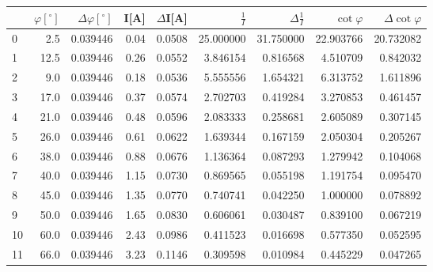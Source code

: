 \begin{tabular}{lrrrrrrrr}
\toprule
{} &  $\varphi[^\circ]$ &  $\Delta \varphi[^\circ]$ &  I[A] &  $\Delta$I[A] &  $\frac{1}{I}$ &  $\Delta \frac{1}{I}$ &  $\cot{\varphi}$ &  $\Delta \cot{\varphi}$ \\
\midrule
0  &                2.5 &                  0.039446 &  0.04 &        0.0508 &      25.000000 &             31.750000 &        22.903766 &               20.732082 \\
1  &               12.5 &                  0.039446 &  0.26 &        0.0552 &       3.846154 &              0.816568 &         4.510709 &                0.842032 \\
2  &                9.0 &                  0.039446 &  0.18 &        0.0536 &       5.555556 &              1.654321 &         6.313752 &                1.611896 \\
3  &               17.0 &                  0.039446 &  0.37 &        0.0574 &       2.702703 &              0.419284 &         3.270853 &                0.461457 \\
4  &               21.0 &                  0.039446 &  0.48 &        0.0596 &       2.083333 &              0.258681 &         2.605089 &                0.307145 \\
5  &               26.0 &                  0.039446 &  0.61 &        0.0622 &       1.639344 &              0.167159 &         2.050304 &                0.205267 \\
6  &               38.0 &                  0.039446 &  0.88 &        0.0676 &       1.136364 &              0.087293 &         1.279942 &                0.104068 \\
7  &               40.0 &                  0.039446 &  1.15 &        0.0730 &       0.869565 &              0.055198 &         1.191754 &                0.095470 \\
8  &               45.0 &                  0.039446 &  1.35 &        0.0770 &       0.740741 &              0.042250 &         1.000000 &                0.078892 \\
9  &               50.0 &                  0.039446 &  1.65 &        0.0830 &       0.606061 &              0.030487 &         0.839100 &                0.067219 \\
10 &               60.0 &                  0.039446 &  2.43 &        0.0986 &       0.411523 &              0.016698 &         0.577350 &                0.052595 \\
11 &               66.0 &                  0.039446 &  3.23 &        0.1146 &       0.309598 &              0.010984 &         0.445229 &                0.047265 \\
\bottomrule
\end{tabular}
